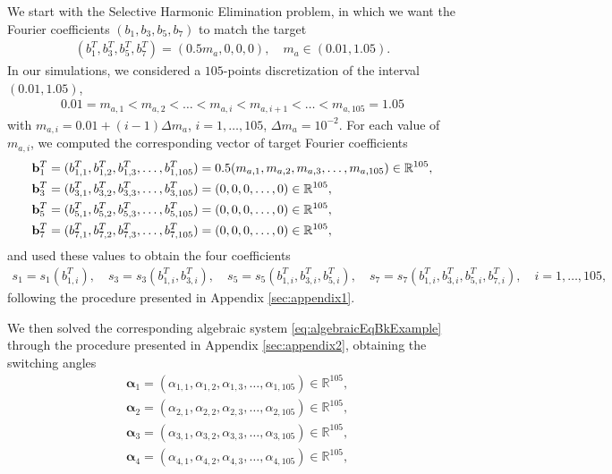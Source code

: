 \documentclass[a4paper]{article}
\numberwithin{equation}{section}
\begin{document}
We start with the Selective Harmonic Elimination problem, in which we want the Fourier coefficients $(b_1,b_3,b_5,b_7)$ to match the target 
\begin{align*}
	(b_1^T,b_3^T,b_5^T,b_7^T) = (0.5m_a,0,0,0), \quad m_a\in (0.01,1.05).	
\end{align*}
In our simulations, we considered a $105$-points discretization of the interval $(0.01,1.05)$, 
\begin{align*}
	0.01 = m_{a,1}< m_{a,2} < \ldots < m_{a,i} < m_{a,i+1} < \ldots < m_{a,105} = 1.05
\end{align*}
with $m_{a,i} = 0.01 + (i-1)\Delta m_a$, $i=1,\ldots,105$, $\Delta m_a=10^{-2}$. For each value of $m_{a,i}$, we computed the corresponding vector of target Fourier coefficients
\begin{align*}
	&{\bf{b}}^T_1 =(b_{1,1}^T,b_{1,2}^T,b_{1,3}^T,\ldots, b_{1,105}^T) = 0.5(m_{a,1},m_{a,2},m_{a,3},\ldots,m_{a,105})\in\mathbb{R}^{105},
	\\
	&{\bf{b}}^T_3 =(b_{3,1}^T,b_{3,2}^T,b_{3,3}^T,\ldots, b_{3,105}^T) = (0,0,0,\ldots,0)\in\mathbb{R}^{105},
	\\
	&{\bf{b}}^T_5 =(b_{5,1}^T,b_{5,2}^T,b_{5,3}^T,\ldots, b_{5,105}^T) = (0,0,0,\ldots,0)\in\mathbb{R}^{105},
	\\
	&{\bf{b}}^T_7 =(b_{7,1}^T,b_{7,2}^T,b_{7,3}^T,\ldots, b_{7,105}^T) = (0,0,0,\ldots,0)\in\mathbb{R}^{105},
\end{align*}
and used these values to obtain the four coefficients 
\begin{align*}
	s_1 = s_1(b_{1,i}^T), \quad s_3 = s_3(b_{1,i}^T,b_{3,i}^T), \quad s_5 = s_5(b_{1,i}^T,b_{3,i}^T,b_{5,i}^T), \quad s_7 = s_7(b_{1,i}^T,b_{3,i}^T,b_{5,i}^T,b_{7,i}^T), \quad i = 1,\ldots, 105,
\end{align*}
following the procedure presented in Appendix \ref{sec:appendix1}.

We then solved the corresponding algebraic system \eqref{eq:algebraicEqBkExample} through the procedure presented in Appendix \ref{sec:appendix2}, obtaining the switching angles
\begin{align*}
	&{\bm{\alpha}}_1 =(\alpha_{1,1},\alpha_{1,2},\alpha_{1,3},\ldots,\alpha_{1,105}) \in\mathbb{R}^{105},
	\\
	&{\bm{\alpha}}_2 =(\alpha_{2,1},\alpha_{2,2},\alpha_{2,3},\ldots,\alpha_{2,105}) \in\mathbb{R}^{105},
	\\
	&{\bm{\alpha}}_3 =(\alpha_{3,1},\alpha_{3,2},\alpha_{3,3},\ldots,\alpha_{3,105}) \in\mathbb{R}^{105},
	\\
	&{\bm{\alpha}}_4 =(\alpha_{4,1},\alpha_{4,2},\alpha_{4,3},\ldots,\alpha_{4,105}) \in\mathbb{R}^{105},
\end{align*}
\end{document}
